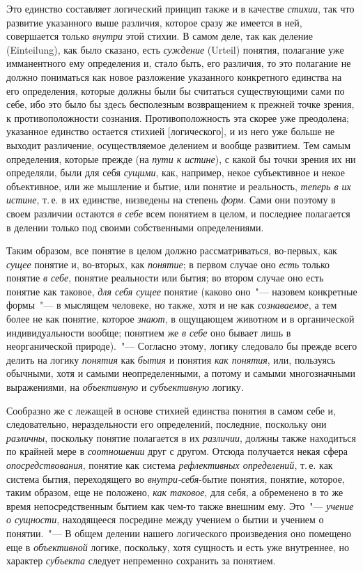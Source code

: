 Это единство составляет логический принцип также
и в качестве \emph{стихии}, так что развитие указанного выше
различия, которое сразу же имеется в ней, совершается
только \emph{внутри} этой стихии. В самом деле, так как деление
(Einteilung), как было сказано, есть \emph{суждение}
(Urteil) понятия, полагание уже имманентного ему определения
и, стало быть, его различия, то это полагание
не должно пониматься как новое разложение указанного
конкретного единства на его определения, которые
должны были бы считаться существующими сами по
себе, ибо это было бы здесь бесполезным возвращением
к прежней точке зрения, к противоположности сознания.
Противоположность эта скорее уже преодолена; указанное
единство остается стихией [логического], и из него
уже больше не выходит различение, осуществляемое делением
и вообще развитием. Тем самым определения,
которые прежде (на \emph{пути к истине}), с какой бы точки
зрения их ни определяли, были для себя \emph{сущими}, как,
например, некое субъективное и некое объективное, или
же мышление и бытие, или понятие и реальность, \emph{теперь
в их истине}, т.\,е. в их единстве, низведены на степень
\emph{форм}. Сами они поэтому в своем различии остаются
\emph{в себе} всем понятием в целом, и последнее полагается в делении
только под своими собственными определениями.

Таким образом, все понятие в целом должно рассматриваться,
во-первых, как \emph{сущее} понятие и, во-вторых,
как \emph{понятие}; в первом случае оно \emph{есть} только понятие
\emph{в себе}, понятие реальности или бытия; во втором случае
оно есть понятие как таковое, \emph{для себя сущее} понятие
(каково оно~"--- назовем конкретные формы~"--- в мыслящем
человеке, но также, хотя и не как \emph{сознаваемое}, а тем
более не как понятие, которое \emph{знают}, в ощущающем животном
и в органической индивидуальности вообще; понятием
же \emph{в себе} оно бывает лишь в неорганической
природе).~"--- Согласно этому, логику следовало бы прежде
всего делить на логику \emph{понятия} как \emph{бытия} и понятия
\emph{как понятия}, или, пользуясь обычными, хотя и самыми
неопределенными, а потому и самыми многозначными
выражениями, на \emph{объективную} и \emph{субъективную} логику.

Сообразно же с лежащей в основе стихией единства
понятия в самом себе и, следовательно, нераздельности
его определений, последние, поскольку они \emph{различны},
поскольку понятие полагается в их \emph{различии}, должны
также находиться по крайней мере в \emph{соотношении} друг
с другом. Отсюда получается некая сфера \emph{опосредствования},
понятие как система \emph{рефлективных определений},
т.\,е. как система бытия, переходящего во \emph{внутри-себя}-бытие
понятия, понятие, которое, таким образом, еще не
положено, \emph{как таковое}, для себя, а обременено в то же
время непосредственным бытием как чем-то также внешним
ему. Это~"--- \emph{учение о сущности}, находящееся посредине
между учением о бытии и учением о понятии.~"---
В общем делении нашего логического произведения оно
помещено еще в \emph{объективной} логике, поскольку, хотя
сущность и есть уже внутреннее, но характер \emph{субъекта}
следует непременно сохранить за понятием.


